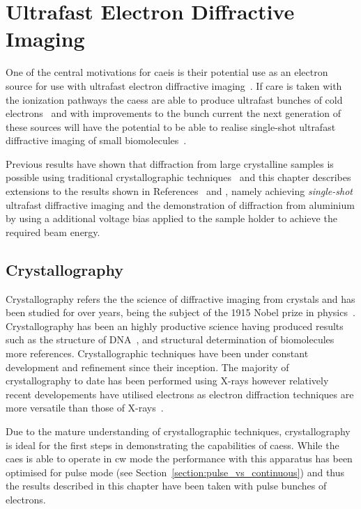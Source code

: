 \chapter{Ultrafast Electron Diffractive Imaging}\label{chapter:diffraction}

One of the central motivations for \gls{caeis} is their potential use as an electron source for use with ultrafast electron diffractive imaging~\cite{speirs_single-shot_2015,van_der_geer_ultracold_2009}.
If care is taken with the ionization pathways the \glspl{caes} are able to produce ultrafast bunches of cold electrons~\cite{speirs_single-shot_2015,speirs_identification_2017,speirs_electron_2017} and with improvements to the bunch current the next generation of these sources will have the potential to be able to realise single-shot ultrafast diffractive imaging of small biomolecules~\cite{mcculloch_cold_2016}.

Previous results have shown that diffraction from large crystalline samples is possible using traditional crystallographic techniques~\cite{speirs_single-shot_2015} and this chapter describes extensions to the results shown in References~\cite{speirs_single-shot_2015} and \cite{speirs_electron_2017}, namely achieving \emph{single-shot} ultrafast diffractive imaging and the demonstration of diffraction from aluminium by using a additional voltage bias applied to the sample holder to achieve the required beam energy.

\section{Crystallography}

Crystallography refers the the science of diffractive imaging from crystals and has been studied for over \unit[100]{years}, being the subject of the 1915 Nobel prize in physics~\cite{bragg_structure_1913}.
Crystallography has been an highly productive science having produced results such as the structure of DNA~\cite{franklin_structure_1953,dennis_eternal_2003}, and structural determination of biomolecules~\cite{longchamp_how_2015} {\color{red} more references}.
Crystallographic techniques have been under constant development and refinement since their inception.
The majority of crystallography to date has been performed using X-rays however relatively recent developements have utilised electrons as electron diffraction techniques are more versatile than those of X-rays~\cite{cowley_electron_1992}.

Due to the mature understanding of crystallographic techniques, crystallography is ideal for the first steps in demonstrating the capabilities of \glspl{caes}.
While the \gls{caes} is able to operate in \gls{cw} mode the performance with this apparatus has been optimised for pulse mode (see Section~\ref{section:pulse_vs_continuous}) and thus the results described in this chapter have been taken with pulse bunches of electrons.


